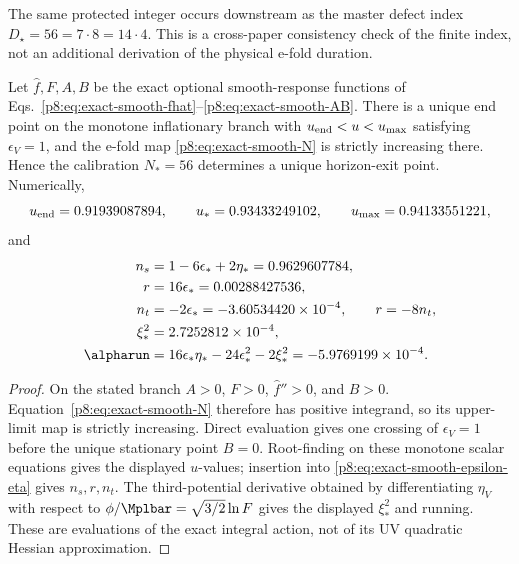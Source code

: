 \documentclass[12pt,a4paper]{article}
\begin{document}
\begin{remark}
\label{p8:rem:Dstar56-compatibility}
The same protected integer occurs downstream as the master defect index \(D_\star=56=7\cdot8=14\cdot4\).  This is a cross-paper consistency check of the finite index, not an additional derivation of the physical e-fold duration.
\end{remark}

\begin{theorem}
\label{p8:thm:exact-slowroll-N56}
Let \(\widehat f,F,A,B\) be the exact optional smooth-response functions of
Eqs.~\eqref{p8:eq:exact-smooth-fhat}--\eqref{p8:eq:exact-smooth-AB}.  There is a
unique end point on the monotone inflationary branch with
\(u_{\rm end}<u<u_{\rm max}\) satisfying \(\epsilon_V=1\), and the e-fold
map \eqref{p8:eq:exact-smooth-N} is strictly increasing there.  Hence the
calibration \(N_*=56\) determines a unique horizon-exit point.  Numerically,
\[
 u_{\rm end}=0.91939087894,\qquad
 u_*=0.93433249102,\qquad
 u_{\rm max}=0.94133551221,
\]
and
\begin{align}
\label{p8:eq:ns-r-exact}
 n_s&=1-6\epsilon_*+2\eta_*=0.9629607784,\\
 r&=16\epsilon_*=0.00288427536,\\
 n_t&=-2\epsilon_*=-3.60534420\times10^{-4},\qquad r=-8n_t,\\
 \xi_*^2&=2.7252812\times10^{-4},\\
 \alpharun&=16\epsilon_*\eta_*-24\epsilon_*^2-2\xi_*^2
 =-5.9769199\times10^{-4}.
\end{align}
\end{theorem}

\begin{proof}
On the stated branch \(A>0\), \(F>0\), \(\widehat f''>0\), and \(B>0\).
Equation~\eqref{p8:eq:exact-smooth-N} therefore has positive integrand, so its
upper-limit map is strictly increasing.  Direct evaluation gives one crossing
of \(\epsilon_V=1\) before the unique stationary point \(B=0\).  Root-finding
on these monotone scalar equations gives the displayed \(u\)-values; insertion
into \eqref{p8:eq:exact-smooth-epsilon-eta} gives \(n_s,r,n_t\).  The
third-potential derivative obtained by differentiating \(\eta_V\) with respect
to \(\phi/\Mplbar=\sqrt{3/2}\ln F\) gives the displayed \(\xi_*^2\) and
running.  These are evaluations of the exact integral action, not of its UV
quadratic Hessian approximation.
\end{proof}
\end{document}
